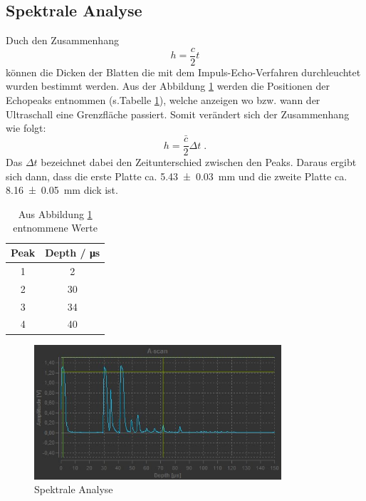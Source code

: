 \subsection{Spektrale Analyse}
Duch den Zusammenhang
\begin{equation*}
h = \frac{c}{2} t
\end{equation*}
können die Dicken der Blatten die mit dem Impuls-Echo-Verfahren durchleuchtet
wurden bestimmt werden. Aus der Abbildung \ref{fig:SA} werden die Positionen
der Echopeaks entnommen (s.Tabelle \ref{tab:SAW}), welche anzeigen wo bzw. wann der Ultraschall eine
Grenzfläche passiert. Somit verändert sich der Zusammenhang wie folgt:
\begin{equation*}
  h = \frac{\bar{c}}{2} \Delta t \; .
\end{equation*}
Das $\Delta t $ bezeichnet dabei den Zeitunterschied zwischen den Peaks.
Daraus ergibt sich dann, dass die erste Platte ca. \SI{5.43(3)}{\milli\meter}
und die zweite Platte ca. \SI{8.16(5)}{\milli\meter} dick ist.
\begin{table}
  \centering
  \caption{Aus Abbildung \ref{fig:SA} entnommene Werte}
  \begin{tabular}{c c}
    \toprule
    Peak & Depth  / \si{\micro\second}\\
    \midrule
    1 & 2 \\
    2 & 30 \\
    3 & 34 \\
    4 & 40 \\
    \bottomrule
  \end{tabular}
\label{tab:SAW}
\end{table}


\begin{figure}
  \centering
  \includegraphics[height = 5cm]{FFS-Data/a_scan_spektrale_analyse.jpg}
  \caption{Spektrale Analyse}
  \label{fig:SA}
\end{figure}
